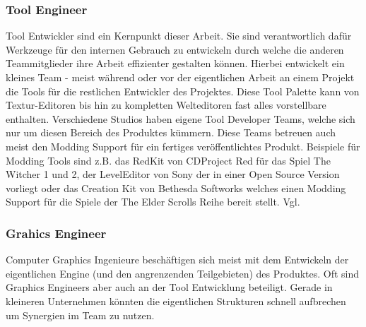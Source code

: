 \documentclass[pagesize, paper=a4, fontsize=12pt, titlepage=true, headings=small, headnosepline, abstractoff, liststotoc, nochapterprefix, plainheadsepline, twoside]{scrreprt}
\begin{document}
\subsubsection{Tool Engineer}
Tool Entwickler sind ein Kernpunkt dieser Arbeit. Sie sind verantwortlich dafür Werkzeuge für den internen Gebrauch zu entwickeln durch welche die anderen Teammitglieder ihre Arbeit effizienter gestalten können. Hierbei entwickelt ein kleines Team - meist während oder vor der eigentlichen Arbeit an einem Projekt die Tools für die restlichen Entwickler des Projektes. Diese Tool Palette kann von Textur-Editoren bis hin zu kompletten Welteditoren fast alles vorstellbare enthalten. Verschiedene Studios haben eigene Tool Developer Teams, welche sich nur um diesen Bereich des Produktes kümmern. Diese Teams betreuen auch meist den Modding Support für ein fertiges veröffentlichtes Produkt. Beispiele für Modding Tools sind z.B. das RedKit von CDProject Red für das Spiel The Witcher 1 und 2, der LevelEditor von Sony der in einer Open Source Version vorliegt oder das Creation Kit von Bethesda Softworks welches einen Modding Support für die Spiele der The Elder Scrolls Reihe bereit stellt. Vgl. \autocite[S. 27 ]{Chandler2006}

\subsubsection{Grahics Engineer}
Computer Graphics Ingenieure beschäftigen sich meist mit dem Entwickeln der eigentlichen Engine (und den angrenzenden Teilgebieten) des Produktes. Oft sind Graphics Engineers aber auch an der Tool Entwicklung beteiligt. Gerade in kleineren Unternehmen könnten die eigentlichen Strukturen schnell aufbrechen um Synergien im Team zu nutzen. \autocite[S. 27 ]{Chandler2006}
\end{document}
